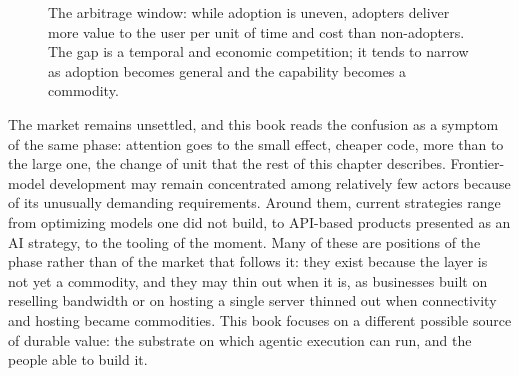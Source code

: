 \documentclass[10pt,oneside,openany]{book}
\begin{document}
\begin{figure}[H]
\centering
{}
\caption{The arbitrage window: while adoption is uneven, adopters deliver more value to the user per unit of time and cost than non-adopters. The gap is a temporal and economic competition; it tends to narrow as adoption becomes general and the capability becomes a commodity.}
\label{fig:arbitrage}
\end{figure}

The market remains unsettled, and this book reads the confusion as a symptom of the same phase: attention goes to the small effect, cheaper code, more than to the large one, the change of unit that the rest of this chapter describes. Frontier-model development may remain concentrated among relatively few actors because of its unusually demanding requirements. Around them, current strategies range from optimizing models one did not build, to API-based products presented as an AI strategy, to the tooling of the moment. Many of these are positions of the phase rather than of the market that follows it: they exist because the layer is not yet a commodity, and they may thin out when it is, as businesses built on reselling bandwidth or on hosting a single server thinned out when connectivity and hosting became commodities. This book focuses on a different possible source of durable value: the substrate on which agentic execution can run, and the people able to build it.
\end{document}
